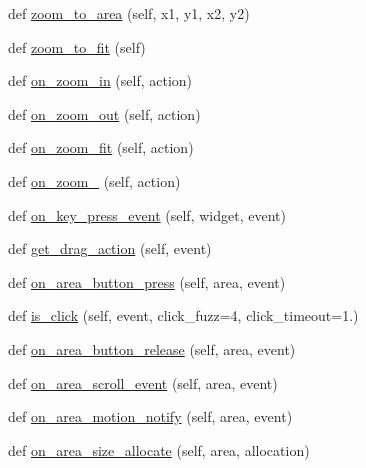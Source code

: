 \begin{DoxyCompactItemize}
def \hyperlink{classsmacc__viewer_1_1xdot_1_1xdot_1_1DotWidget_a278ba1b5d05276b814fce228588f8389}{zoom\+\_\+to\+\_\+area} (self, x1, y1, x2, y2)
\item 
def \hyperlink{classsmacc__viewer_1_1xdot_1_1xdot_1_1DotWidget_a52852977b8266649f643aabe89b5355e}{zoom\+\_\+to\+\_\+fit} (self)
\item 
def \hyperlink{classsmacc__viewer_1_1xdot_1_1xdot_1_1DotWidget_a5dd8c1e4b5e2435e463d74704b833310}{on\+\_\+zoom\+\_\+in} (self, action)
\item 
def \hyperlink{classsmacc__viewer_1_1xdot_1_1xdot_1_1DotWidget_ab26a5f3533ce7f89f62eb51ec905180f}{on\+\_\+zoom\+\_\+out} (self, action)
\item 
def \hyperlink{classsmacc__viewer_1_1xdot_1_1xdot_1_1DotWidget_a2a0dd13b69fe865db5c166a284b8267b}{on\+\_\+zoom\+\_\+fit} (self, action)
\item 
def \hyperlink{classsmacc__viewer_1_1xdot_1_1xdot_1_1DotWidget_a307b0e9251b0e64f1da2ed6654bba763}{on\+\_\+zoom\+\_} (self, action)
\item 
def \hyperlink{classsmacc__viewer_1_1xdot_1_1xdot_1_1DotWidget_a7ba7befbc2da3494a94bcfcc8a09b2ce}{on\+\_\+key\+\_\+press\+\_\+event} (self, widget, event)
\item 
def \hyperlink{classsmacc__viewer_1_1xdot_1_1xdot_1_1DotWidget_acc7a11b73a31401bb3ee97475585bb80}{get\+\_\+drag\+\_\+action} (self, event)
\item 
def \hyperlink{classsmacc__viewer_1_1xdot_1_1xdot_1_1DotWidget_a2ddeaf61608db7ada606f96fc59db630}{on\+\_\+area\+\_\+button\+\_\+press} (self, area, event)
\item 
def \hyperlink{classsmacc__viewer_1_1xdot_1_1xdot_1_1DotWidget_aeb999fe6900e9e916cf5eacb5d2e0108}{is\+\_\+click} (self, event, click\+\_\+fuzz=4, click\+\_\+timeout=1.)
\item 
def \hyperlink{classsmacc__viewer_1_1xdot_1_1xdot_1_1DotWidget_a0d3a221636156c6cddf5c8890ef23f65}{on\+\_\+area\+\_\+button\+\_\+release} (self, area, event)
\item 
def \hyperlink{classsmacc__viewer_1_1xdot_1_1xdot_1_1DotWidget_ada4f72a63399dca56b8dbbd3db11938e}{on\+\_\+area\+\_\+scroll\+\_\+event} (self, area, event)
\item 
def \hyperlink{classsmacc__viewer_1_1xdot_1_1xdot_1_1DotWidget_a8509742beaca96b9bcf63743d91acafc}{on\+\_\+area\+\_\+motion\+\_\+notify} (self, area, event)
\item 
def \hyperlink{classsmacc__viewer_1_1xdot_1_1xdot_1_1DotWidget_a31d89d05153706f200e98165d8891027}{on\+\_\+area\+\_\+size\+\_\+allocate} (self, area, allocation)

\end{DoxyCompactItemize}
